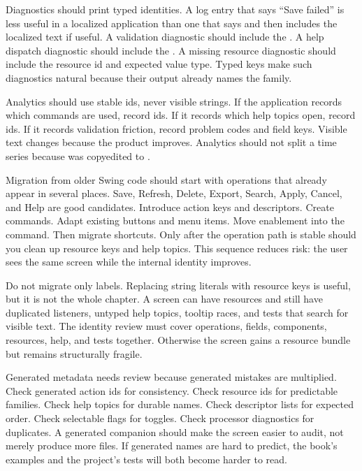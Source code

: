 Diagnostics should print typed identities. A log entry that says ``Save failed''
is less useful in a localized application than one that says
 and then includes the localized text if useful.
A validation diagnostic should include the . A help dispatch
diagnostic should include the . A missing resource diagnostic
should include the resource id and expected value type. Typed keys make such
diagnostics natural because their  output already names the
family.

Analytics should use stable ids, never visible strings. If the application
records which commands are used, record  ids. If it records
which help topics open, record  ids. If it records validation
friction, record problem codes and field keys. Visible text changes because
the product improves. Analytics should not split a time series because
 was copyedited to .

Migration from older Swing code should start with operations that already
appear in several places. Save, Refresh, Delete, Export, Search, Apply,
Cancel, and Help are good candidates. Introduce action keys and descriptors.
Create commands. Adapt existing buttons and menu items. Move enablement into
the command. Then migrate shortcuts. Only after the operation path is stable
should you clean up resource keys and help topics. This sequence reduces risk:
the user sees the same screen while the internal identity improves.

Do not migrate only labels. Replacing string literals with resource keys is
useful, but it is not the whole chapter. A screen can have resources and still
have duplicated listeners, untyped help topics, tooltip races, and tests that
search for visible text. The identity review must cover operations, fields,
components, resources, help, and tests together. Otherwise the screen gains a
resource bundle but remains structurally fragile.

Generated metadata needs review because generated mistakes are multiplied.
Check generated action ids for consistency. Check resource ids for predictable
families. Check help topics for durable names. Check descriptor lists for
expected order. Check selectable flags for toggles. Check processor diagnostics
for duplicates. A generated companion should make the screen easier to audit,
not merely produce more files. If generated names are hard to predict, the
book's examples and the project's tests will both become harder to read.

